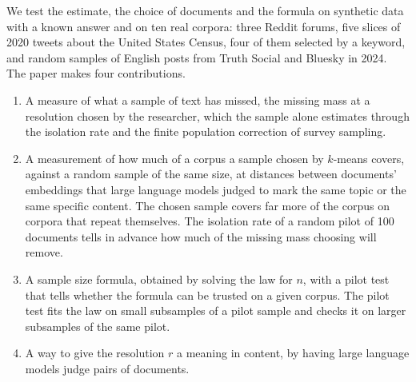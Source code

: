 We test the estimate, the choice of documents and the formula on synthetic data with a known answer and on ten real corpora: three Reddit forums, five slices of 2020 tweets about the United States Census, four of them selected by a keyword, and random samples of English posts from Truth Social and Bluesky in 2024. The paper makes four contributions.
\begin{enumerate}
\item A measure of what a sample of text has missed, the missing mass at a resolution chosen by the researcher, which the sample alone estimates through the isolation rate and the finite population correction of survey sampling.
\item A measurement of how much of a corpus a sample chosen by $k$-means covers, against a random sample of the same size, at distances between documents' embeddings that large language models judged to mark the same topic or the same specific content. The chosen sample covers far more of the corpus on corpora that repeat themselves. The isolation rate of a random pilot of 100 documents tells in advance how much of the missing mass choosing will remove.
\item A sample size formula, obtained by solving the law for $n$, with a pilot test that tells whether the formula can be trusted on a given corpus. The pilot test fits the law on small subsamples of a pilot sample and checks it on larger subsamples of the same pilot.
\item A way to give the resolution $r$ a meaning in content, by having large language models judge pairs of documents.
\end{enumerate}
